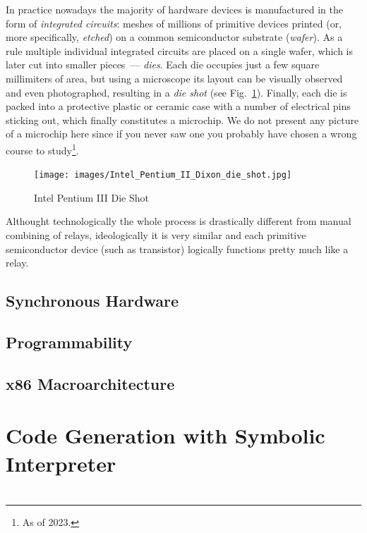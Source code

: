 In practice nowadays the majority of hardware devices is manufactured in the form of \emph{integrated circuits}: meshes
of millions of primitive devices printed (or, more specifically, \emph{etched}) on a common semiconductor substrate (\emph{wafer}).
As a rule multiple individual integrated circuits are placed on a single wafer, which is later cut into smaller
pieces~--- \emph{dies}. Each die occupies just a few square millimiters of area, but using a microscope its
layout can be visually observed and even photographed, resulting in a \emph{die shot} (see Fig.~\ref{die-shot}).
Finally, each die is packed into a protective plastic or ceramic case with a number of electrical pins sticking out, which
finally constitutes a microchip. We do not present any picture of a microchip here since if you never saw one you
probably have chosen a wrong course to study\footnote{As of 2023.}.

\begin{figure}[t]
  \centering
  \texttt{[image: images/Intel\_Pentium\_II\_Dixon\_die\_shot.jpg]}
  \caption{Intel Pentium III Die Shot}
  \label{die-shot}
\end{figure}

Althought technologically the whole process is drastically different from manual combining of relays, ideologically
it is very similar and each primitive semiconductor device (such as transistor) logically functions pretty much
like a relay. 



\subsection{Synchronous Hardware}

\subsection{Programmability}

\subsection{x86 Macroarchitecture}

\section{Code Generation with Symbolic Interpreter}

\section{}


